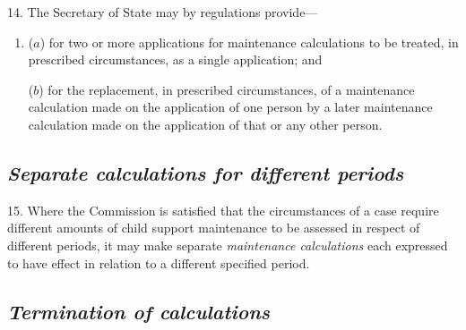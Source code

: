 \documentclass[12pt,a4paper]{article}
\begin{document}
14. The Secretary of State may by regulations provide—
\begin{enumerate}\item[]
($a$) for two or more applications for maintenance calculations to be treated, in prescribed circumstances, as a single application; and

($b$) for the replacement, in prescribed circumstances, of a maintenance calculation made on the application of one person by a later maintenance calculation made on the application of that or any other person.
\end{enumerate}


\subsection*{\itshape Separate 
\emph{calculations}  %
for different periods}

15. Where 
the 
Commission  %
is satisfied that the circumstances of a case require different amounts of child support maintenance to be assessed in respect of different periods, 
it  %
may make separate 
\emph{maintenance calculations}  %
each expressed to have effect in relation to a different specified period.


\subsection*{\itshape Termination of 
\emph{calculations}  %
}
\end{document}
